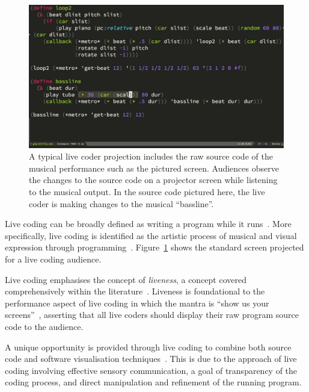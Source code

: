 \begin{figure}
\centering
\includegraphics[width=1.0\textwidth]{../images/code/live-coding-screen.png}
\caption[Typical live coding screen]{A typical live coder projection includes the raw source code of the musical performance such as the pictured screen. Audiences observe the changes to the source code on a projector screen while listening to the musical output. In the source code pictured here, the live coder is making changes to the musical ``bassline''.}
\label{fig:live-coding-screen}
\end{figure}


Live coding can be broadly defined as writing a program while it runs~\cite{Ward2004}. More specifically, live coding is identified as the artistic process of musical and visual expression through programming~\cite{Collins2003}. Figure~\ref{fig:live-coding-screen} shows the standard screen projected for a live coding audience.

Live coding emphasises the concept of \emph{liveness}, a concept covered comprehensively within the literature~\cite{Auslander,Masura2007}. Liveness is foundational to the performance aspect of live coding in which the mantra is ``show us your screens''~\cite{Toplap}, asserting that all live coders should display their raw program source code to the audience.

A unique opportunity is provided through live coding to combine both source code and software visualisation techniques~\cite{McLean2010a}. This is due to the approach of live coding involving effective sensory communication, a goal of transparency of the coding process, and direct manipulation and refinement of the running program.

